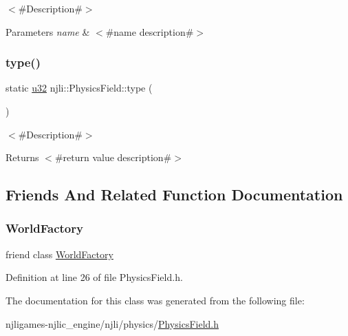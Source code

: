 $<$\#\+Description\#$>$


\begin{DoxyParams}{Parameters}
{\em name} & $<$\#name description\#$>$ \\
\hline
\end{DoxyParams}
\mbox{\label{classnjli_1_1_physics_field_af3b1cbe263122bd34e418930a9a2f9e6}} 
\subsubsection{\texorpdfstring{type()}{type()}}
{\footnotesize\ttfamily static \mbox{\hyperlink{_util_8h_a10e94b422ef0c20dcdec20d31a1f5049}{u32}} njli\+::\+Physics\+Field\+::type (\begin{DoxyParamCaption}{ }\end{DoxyParamCaption})\hspace{0.3cm}{\ttfamily [static]}}

$<$\#\+Description\#$>$

\begin{DoxyReturn}{Returns}
$<$\#return value description\#$>$ 
\end{DoxyReturn}


\subsection{Friends And Related Function Documentation}
\mbox{\label{classnjli_1_1_physics_field_acb96ebb09abe8f2a37a915a842babfac}} 
\subsubsection{\texorpdfstring{World\+Factory}{WorldFactory}}
{\footnotesize\ttfamily friend class \mbox{\hyperlink{classnjli_1_1_world_factory}{World\+Factory}}\hspace{0.3cm}{\ttfamily [friend]}}



Definition at line 26 of file Physics\+Field.\+h.



The documentation for this class was generated from the following file\+:\begin{DoxyCompactItemize}
\item 
njligames-\/njlic\+\_\+engine/njli/physics/\mbox{\hyperlink{_physics_field_8h}{Physics\+Field.\+h}}\end{DoxyCompactItemize}
